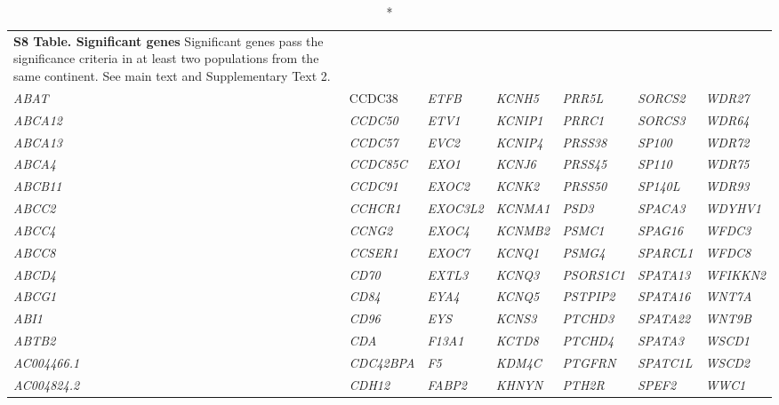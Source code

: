 \begin{refsection}
\begin{otherlanguage}{english}
\begin{scriptsize}
\begin{longtable}{lllllll}
\caption*{\textbf{S8 Table. Significant genes} Significant genes pass the significance criteria in at least two populations from the same continent. See main text and Supplementary Text 2.} \\
\rowcolor[HTML]{EFEFEF} 
\textit{ABAT} & CCDC38 & \textit{ETFB} & \textit{KCNH5} & \textit{PRR5L} & \textit{SORCS2} & \textit{WDR27} \\
\textit{ABCA12} & \textit{CCDC50} & \textit{ETV1} & \textit{KCNIP1} & \textit{PRRC1} & \textit{SORCS3} & \textit{WDR64} \\
\textit{ABCA13} & \textit{CCDC57} & \textit{EVC2} & \textit{KCNIP4} & \textit{PRSS38} & \textit{SP100} & \textit{WDR72} \\
\textit{ABCA4} & \textit{CCDC85C} & \textit{EXO1} & \textit{KCNJ6} & \textit{PRSS45} & \textit{SP110} & \textit{WDR75} \\
\textit{ABCB11} & \textit{CCDC91} & \textit{EXOC2} & \textit{KCNK2} & \textit{PRSS50} & \textit{SP140L} & \textit{WDR93} \\
\textit{ABCC2} & \textit{CCHCR1} & \textit{EXOC3L2} & \textit{KCNMA1} & \textit{PSD3} & \textit{SPACA3} & \textit{WDYHV1} \\
\textit{ABCC4} & \textit{CCNG2} & \textit{EXOC4} & \textit{KCNMB2} & \textit{PSMC1} & \textit{SPAG16} & \textit{WFDC3} \\
\textit{ABCC8} & \textit{CCSER1} & \textit{EXOC7} & \textit{KCNQ1} & \textit{PSMG4} & \textit{SPARCL1} & \textit{WFDC8} \\
\textit{ABCD4} & \textit{CD70} & \textit{EXTL3} & \textit{KCNQ3} & \textit{PSORS1C1} & \textit{SPATA13} & \textit{WFIKKN2} \\
\textit{ABCG1} & \textit{CD84} & \textit{EYA4} & \textit{KCNQ5} & \textit{PSTPIP2} & \textit{SPATA16} & \textit{WNT7A} \\
\textit{ABI1} & \textit{CD96} & \textit{EYS} & \textit{KCNS3} & \textit{PTCHD3} & \textit{SPATA22} & \textit{WNT9B} \\
\textit{ABTB2} & \textit{CDA} & \textit{F13A1} & \textit{KCTD8} & \textit{PTCHD4} & \textit{SPATA3} & \textit{WSCD1} \\
\textit{AC004466.1} & \textit{CDC42BPA} & \textit{F5} & \textit{KDM4C} & \textit{PTGFRN} & \textit{SPATC1L} & \textit{WSCD2} \\
\textit{AC004824.2} & \textit{CDH12} & \textit{FABP2} & \textit{KHNYN} & \textit{PTH2R} & \textit{SPEF2} & \textit{WWC1} \\

\end{longtable}
\end{scriptsize}
\end{otherlanguage}
\end{refsection}
